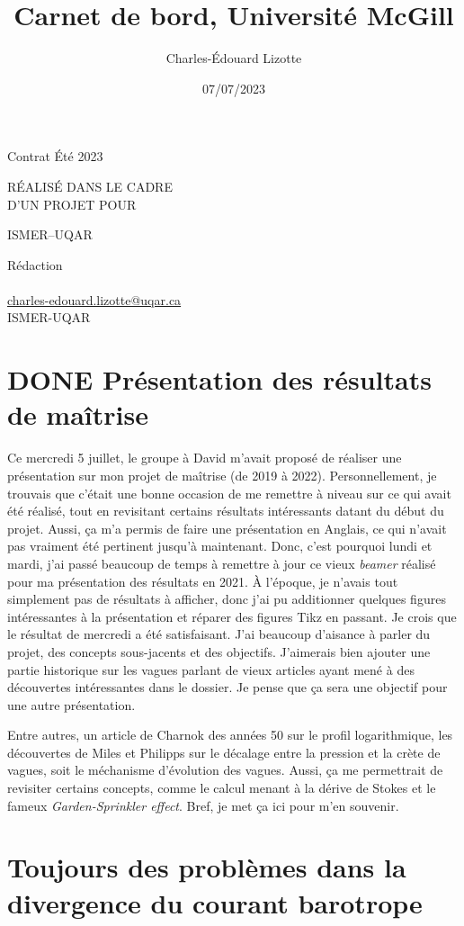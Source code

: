 \documentclass[10pt]{article}
\author{Charles-Édouard Lizotte}
\date{07/07/2023}
\title{Carnet de bord, Université McGill}
\makeatletter
\numberwithin{equation}{section}
\newcommand{\mytitlepage}{
\begin{titlepage}
\begin{center}
{\Large Contrat Été 2023 \par}
\vspace{2cm}
{\Large \MakeUppercase{\thetitle} \par}
\vspace{2cm}
RÉALISÉ DANS LE CADRE\\ D'UN PROJET POUR \par
\vspace{2cm}
{\Large ISMER--UQAR \par}
\vspace{2cm}
{\thedate}
\end{center}
\vfill
Rédaction \\
{\theauthor}\\
\url{charles-edouard.lizotte@uqar.ca}\\
ISMER-UQAR
\end{titlepage}
}
\makeatother
\begin{document}
\mytitlepage
\tableofcontents\newpage



\section{{\bfseries\sffamily DONE} Présentation des résultats de maîtrise}
\label{sec:org20ce7b2}
Ce mercredi 5 juillet, le groupe à David m'avait proposé de réaliser une présentation sur mon projet de maîtrise (de 2019 à 2022).
Personnellement, je trouvais que c'était une bonne occasion de me remettre à niveau sur ce qui avait été réalisé, tout en revisitant certains résultats intéressants datant du début du projet.
Aussi, ça m'a permis de faire une présentation en Anglais, ce qui n'avait pas vraiment été pertinent jusqu'à maintenant.
Donc, c'est pourquoi lundi et mardi, j'ai passé beaucoup de temps à remettre à jour ce vieux \emph{beamer} réalisé pour ma présentation des résultats en 2021.
À l'époque, je n'avais tout simplement pas de résultats à afficher, donc j'ai pu additionner quelques figures intéressantes à la présentation et réparer des figures Tikz en passant.
Je crois que le résultat de mercredi a été satisfaisant.
J'ai beaucoup d'aisance à parler du projet, des concepts sous-jacents et des objectifs.
J'aimerais bien ajouter une partie historique sur les vagues parlant de vieux articles ayant mené à des découvertes intéressantes dans le dossier.
Je pense que ça sera une objectif pour une autre présentation.\bigskip

Entre autres, un article de Charnok des années 50 sur le profil logarithmique, les découvertes de Miles et Philipps sur le décalage entre la pression et la crète de vagues, soit le méchanisme d'évolution des vagues.
Aussi, ça me permettrait de revisiter certains concepts, comme le calcul menant à la dérive de Stokes et le fameux \emph{Garden-Sprinkler effect}.
Bref, je met ça ici pour m'en souvenir.

\section{Toujours des problèmes dans la divergence du courant barotrope}
\label{sec:org644b740}
\end{document}
